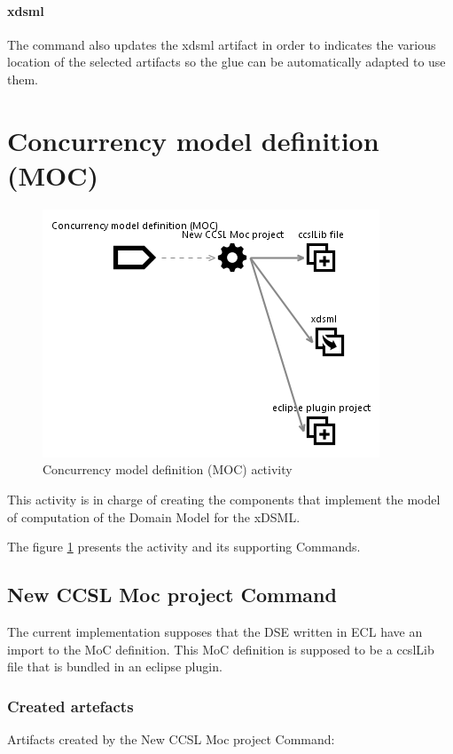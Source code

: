 \documentclass{gemoc} %
\begin{document}
\paragraph{xdsml} 
The command also updates the xdsml artifact in order to indicates the various location of the selected artifacts so the glue can be automatically adapted to use them.

\section{Concurrency model definition (MOC)}
\label{sec:Concurrency_model_definition_(MOC)}
\begin{figure}[h]
		\center
		\includegraphics*[trim=0.0cm 0.0cm 0cm 0.0cm, clip=true]{fig/Concurrency_model_definition_(MOC)}
		\caption{Concurrency model definition (MOC) activity}
		\label{fig:Concurrency_model_definition_(MOC)}
\end{figure}

This activity is in charge of creating the components that implement the model of computation of the Domain Model for the xDSML. 

The figure \ref{fig:Concurrency_model_definition_(MOC)} presents the activity and its supporting Commands.

\subsection{New CCSL Moc project Command}
The current implementation supposes that the DSE written in ECL have an import to the MoC definition. This MoC definition is supposed to be a ccslLib file that is bundled in an eclipse plugin.
\subsubsection{Created artefacts}
Artifacts created by the New CCSL Moc project Command:
\end{document}
